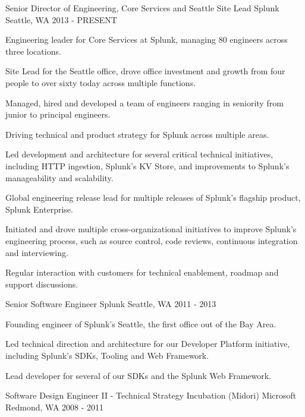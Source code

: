 \begin{cventries}
  \cventry
    {Senior Director of Engineering, Core Services and Seattle Site Lead}
    {Splunk}
    {Seattle, WA}
    {2013 - PRESENT}
    {
      \begin{cvitems}
        \item {Engineering leader for Core Services at Splunk, managing 80 engineers across three locations.}
        \item {Site Lead for the Seattle office, drove office investment and growth from four people to over sixty today across multiple functions.}
        \item {Managed, hired and developed a team of engineers ranging in seniority from junior to principal engineers.}
        \item {Driving technical and product strategy for Splunk across multiple areas.}
        \item {Led development and architecture for several critical technical initiatives, including HTTP ingestion, Splunk's KV Store, and improvements to Splunk's manageability and scalability.}
        \item {Global engineering release lead for multiple releases of Splunk's flagship product, Splunk Enterprise.}
        \item {Initiated and drove multiple cross-organizational initiatives to improve Splunk's engineering process, such as source control, code reviews, continuous integration and interviewing.}
        \item {Regular interaction with customers for technical enablement, roadmap and support discussions.}
      \end{cvitems}
    }
  \cventry
    {Senior Software Engineer}
    {Splunk}
    {Seattle, WA}
    {2011 - 2013}
    {
      \begin{cvitems}
        \item {Founding engineer of Splunk's Seattle, the first office out of the Bay Area.}
        \item {Led technical direction and architecture for our Developer Platform initiative, including Splunk's SDKs, Tooling and Web Framework.}
        \item {Lead developer for several of our SDKs and the Splunk Web Framework.}
      \end{cvitems}
    }
  \cventry
    {Software Design Engineer II - Technical Strategy Incubation (Midori)}
    {Microsoft}
    {Redmond, WA}
    {2008 - 2011}
    {
      \begin{cvitems}

\end{cvitems}}
\end{cventries}
